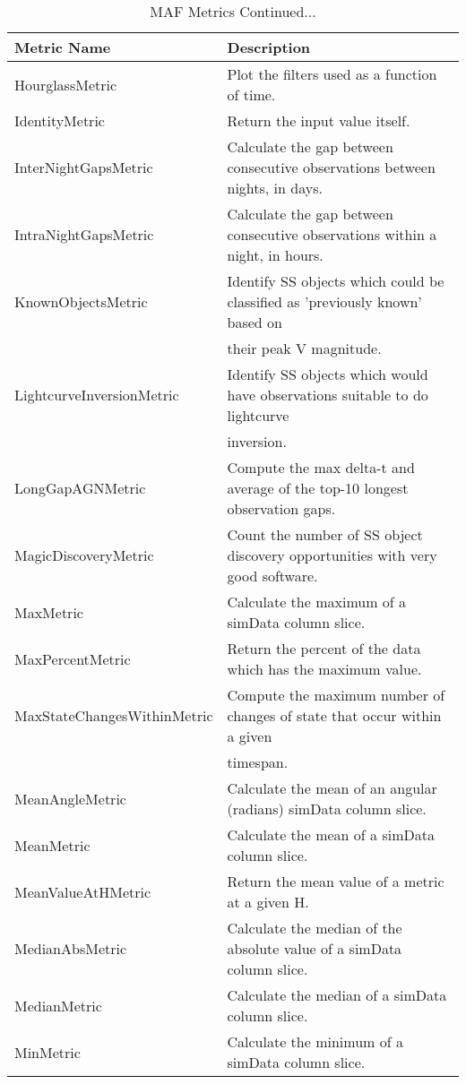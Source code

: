 \begin{table}
\scriptsize
\caption{MAF Metrics Continued...}
\begin{tabular}{ll}
\hline
                   Metric Name &                                                                       Description \\
\hline
 HourglassMetric &  Plot the filters used as a function of time. \\
 IdentityMetric &  Return the input value itself. \\
 InterNightGapsMetric &  Calculate the gap between consecutive observations between nights, in days. \\
 IntraNightGapsMetric &  Calculate the gap between consecutive observations within a night, in hours. \\
 KnownObjectsMetric &  Identify SS objects which could be classified as 'previously known' based on \\
  &  their peak V magnitude. \\
 LightcurveInversionMetric &  Identify SS objects which would have observations suitable to do lightcurve \\
  &  inversion. \\
 LongGapAGNMetric &  Compute the max delta-t and average of the top-10 longest observation gaps. \\
 MagicDiscoveryMetric &  Count the number of SS object discovery opportunities with very good software. \\
 MaxMetric &  Calculate the maximum of a simData column slice. \\
 MaxPercentMetric &  Return the percent of the data which has the maximum value. \\
 MaxStateChangesWithinMetric &  Compute the maximum number of changes of state that occur within a given \\
  &  timespan. \\
 MeanAngleMetric &  Calculate the mean of an angular (radians) simData column slice. \\
 MeanMetric &  Calculate the mean of a simData column slice. \\
 MeanValueAtHMetric &  Return the mean value of a metric at a given H. \\
 MedianAbsMetric &  Calculate the median of the absolute value of a simData column slice. \\
 MedianMetric &  Calculate the median of a simData column slice. \\
 MinMetric &  Calculate the minimum of a simData column slice. \\

\end{tabular}
\end{table}
